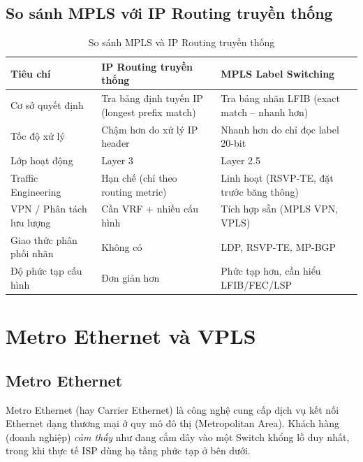 \subsection{So sánh MPLS với IP Routing truyền thống}

\begin{table}[htbp]
    \centering
    \caption{So sánh MPLS và IP Routing truyền thống}
    \vspace{0.2cm}
    \begin{tabularx}{\textwidth}{|>{\raggedright\arraybackslash}p{3.5cm}|>{\raggedright\arraybackslash}X|>{\raggedright\arraybackslash}X|}
        \hline
        \textbf{Tiêu chí} & \textbf{IP Routing truyền thống} & \textbf{MPLS Label Switching} \\ \hline
        Cơ sở quyết định & Tra bảng định tuyến IP (longest prefix match) & Tra bảng nhãn LFIB (exact match – nhanh hơn) \\ \hline
        Tốc độ xử lý & Chậm hơn do xử lý IP header & Nhanh hơn do chỉ đọc label 20-bit \\ \hline
        Lớp hoạt động & Layer 3 & Layer 2.5 \\ \hline
        Traffic Engineering & Hạn chế (chỉ theo routing metric) & Linh hoạt (RSVP-TE, đặt trước băng thông) \\ \hline
        VPN / Phân tách lưu lượng & Cần VRF + nhiều cấu hình & Tích hợp sẵn (MPLS VPN, VPLS) \\ \hline
        Giao thức phân phối nhãn & Không có & LDP, RSVP-TE, MP-BGP \\ \hline
        Độ phức tạp cấu hình & Đơn giản hơn & Phức tạp hơn, cần hiểu LFIB/FEC/LSP \\ \hline
    \end{tabularx}
\end{table}

\section{Metro Ethernet và VPLS}

\subsection{Metro Ethernet}

Metro Ethernet (hay Carrier Ethernet) là công nghệ cung cấp dịch vụ kết nối Ethernet dạng thương mại ở quy mô đô thị (Metropolitan Area). Khách hàng (doanh nghiệp) \textit{cảm thấy} như đang cắm dây vào một Switch khổng lồ duy nhất, trong khi thực tế ISP dùng hạ tầng phức tạp ở bên dưới.

